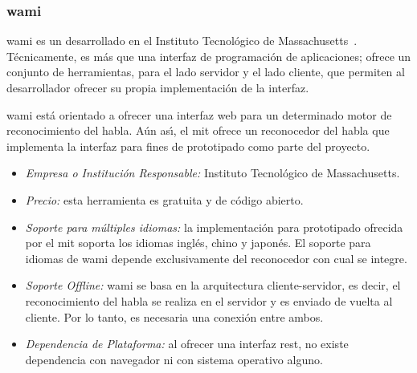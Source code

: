 \subsubsection{\gls{wami}}
\label{sec:wami}

\gls{wami} es un  desarrollado en el Instituto Tecnol\'ogico de
\mbox{Massachusetts \cite{WamiHome}}. T\'ecnicamente, es m\'as que una interfaz de programaci\'on
de aplicaciones; ofrece un conjunto de herramientas, para el lado servidor y el lado cliente,
que permiten al desarrollador ofrecer su propia implementaci\'on de la interfaz.

\gls{wami} est\'a orientado a ofrecer una interfaz web para un determinado motor de reconocimiento del habla. 
A\'un as{\'\i}, el \gls{mit} ofrece un reconocedor del habla que implementa la interfaz para fines 
de prototipado como parte del proyecto.

\begin{itemize}
	\item \emph{Empresa o Instituci\'on Responsable:} Instituto Tecnol\'ogico de Massachusetts.
	\item \emph{Precio:} esta herramienta es gratuita y de c\'odigo abierto.
	\item \emph{Soporte para m\'ultiples idiomas:} la implementaci\'on para prototipado ofrecida
	por el \gls{mit} soporta los idiomas ingl\'es, chino y japon\'es. El soporte para idiomas de \gls{wami}
	depende exclusivamente del reconocedor con cual se integre.
	\item \emph{Soporte Offline:} \gls{wami} se basa en la arquitectura cliente-servidor, es decir, el reconocimiento del habla 
    se realiza en el servidor y es enviado de vuelta al cliente. Por lo tanto, es necesaria una conexi\'on entre ambos.
	\item \emph{Dependencia de Plataforma:} al ofrecer una interfaz \gls{rest}, no existe dependencia con
	navegador ni con sistema operativo alguno.
\end{itemize}
